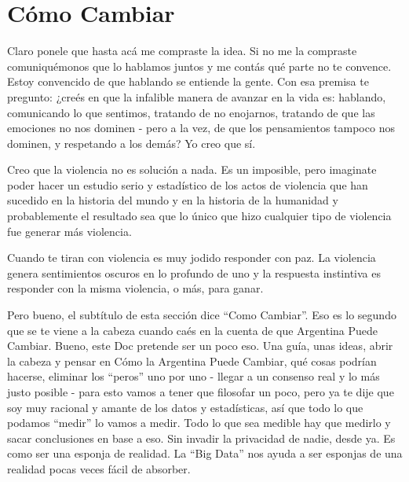 \documentclass[
]{book}
\begin{document}
\hypertarget{cuxf3mo-cambiar}{%
\section{Cómo Cambiar}\label{cuxf3mo-cambiar}}

Claro ponele que hasta acá me compraste la idea. Si no me la compraste comuniquémonos que lo hablamos juntos y me contás qué parte no te convence. Estoy convencido de que hablando se entiende la gente. Con esa premisa te pregunto: ¿creés en que la infalible manera de avanzar en la vida es: hablando, comunicando lo que sentimos, tratando de no enojarnos, tratando de que las emociones no nos dominen - pero a la vez, de que los pensamientos tampoco nos dominen, y respetando a los demás? Yo creo que sí.

Creo que la violencia no es solución a nada. Es un imposible, pero imaginate poder hacer un estudio serio y estadístico de los actos de violencia que han sucedido en la historia del mundo y en la historia de la humanidad y probablemente el resultado sea que lo único que hizo cualquier tipo de violencia fue generar más violencia.

Cuando te tiran con violencia es muy jodido responder con paz. La violencia genera sentimientos oscuros en lo profundo de uno y la respuesta instintiva es responder con la misma violencia, o más, para ganar.

Pero bueno, el subtítulo de esta sección dice ``Como Cambiar''. Eso es lo segundo que se te viene a la cabeza cuando caés en la cuenta de que Argentina Puede Cambiar. Bueno, este Doc pretende ser un poco eso. Una guía, unas ideas, abrir la cabeza y pensar en Cómo la Argentina Puede Cambiar, qué cosas podrían hacerse, eliminar los ``peros'' uno por uno - llegar a un consenso real y lo más justo posible - para esto vamos a tener que filosofar un poco, pero ya te dije que soy muy racional y amante de los datos y estadísticas, así que todo lo que podamos ``medir'' lo vamos a medir. Todo lo que sea medible hay que medirlo y sacar conclusiones en base a eso. Sin invadir la privacidad de nadie, desde ya. Es como ser una esponja de realidad. La ``Big Data'' nos ayuda a ser esponjas de una realidad pocas veces fácil de absorber.

  
\end{document}
